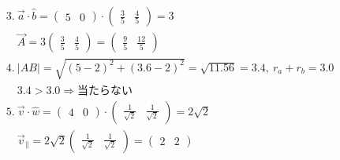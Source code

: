 \documentclass[paper=b4j,landscape,twocolumn,fleqn]{jlreq}
\begin{document}
\begin{align*}
&3.\ \vec{a}\cdot\hat{b}=\begin{pmatrix}5 & 0\end{pmatrix}\cdot\begin{pmatrix}\frac35 & \frac45\end{pmatrix}=3\\
&\quad \vec{A}=3\begin{pmatrix}\frac35 & \frac45\end{pmatrix}=\begin{pmatrix}\frac95 & \frac{12}{5}\end{pmatrix}\\
&4.\ |AB|=\sqrt{(5-2)^2+(3.6-2)^2}=\sqrt{11.56}=3.4,\ r_a+r_b=3.0\\
&\quad 3.4>3.0\Rightarrow\text{当たらない}\\
&5.\ \vec{v}\cdot\hat{w}=\begin{pmatrix}4 & 0\end{pmatrix}\cdot\begin{pmatrix}\frac1{\sqrt2} & \frac1{\sqrt2}\end{pmatrix}=2\sqrt2\\
&\quad \vec{v}_{\parallel}=2\sqrt2\begin{pmatrix}\frac1{\sqrt2} & \frac1{\sqrt2}\end{pmatrix}=\begin{pmatrix}2 & 2\end{pmatrix}
\end{align*}
\end{document}
